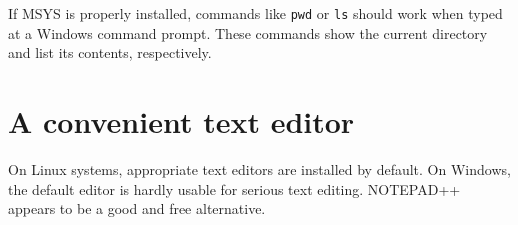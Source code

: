 If MSYS is properly installed, commands like \verb!pwd! or \verb!ls! should work when typed at a Windows command prompt. These commands show the current directory and list its contents, respectively.


\section{A convenient text editor} \label{sec:extSoft:editor}

On Linux systems, appropriate text editors are installed by default. On Windows, the default editor is hardly usable for serious text editing. NOTEPAD++ appears to be a good and free alternative.
